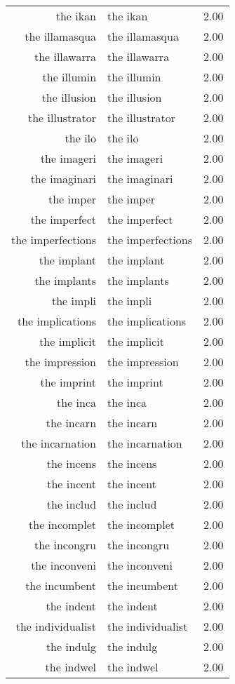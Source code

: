 \begin{table}[ht]
\begin{tabular}{rlr}
  the ikan & the ikan & 2.00 \\ 
  the illamasqua & the illamasqua & 2.00 \\ 
  the illawarra & the illawarra & 2.00 \\ 
  the illumin & the illumin & 2.00 \\ 
  the illusion & the illusion & 2.00 \\ 
  the illustrator & the illustrator & 2.00 \\ 
  the ilo & the ilo & 2.00 \\ 
  the imageri & the imageri & 2.00 \\ 
  the imaginari & the imaginari & 2.00 \\ 
  the imper & the imper & 2.00 \\ 
  the imperfect & the imperfect & 2.00 \\ 
  the imperfections & the imperfections & 2.00 \\ 
  the implant & the implant & 2.00 \\ 
  the implants & the implants & 2.00 \\ 
  the impli & the impli & 2.00 \\ 
  the implications & the implications & 2.00 \\ 
  the implicit & the implicit & 2.00 \\ 
  the impression & the impression & 2.00 \\ 
  the imprint & the imprint & 2.00 \\ 
  the inca & the inca & 2.00 \\ 
  the incarn & the incarn & 2.00 \\ 
  the incarnation & the incarnation & 2.00 \\ 
  the incens & the incens & 2.00 \\ 
  the incent & the incent & 2.00 \\ 
  the includ & the includ & 2.00 \\ 
  the incomplet & the incomplet & 2.00 \\ 
  the incongru & the incongru & 2.00 \\ 
  the inconveni & the inconveni & 2.00 \\ 
  the incumbent & the incumbent & 2.00 \\ 
  the indent & the indent & 2.00 \\ 
  the individualist & the individualist & 2.00 \\ 
  the indulg & the indulg & 2.00 \\ 
  the indwel & the indwel & 2.00 \\ 

\end{tabular}
\end{table}
